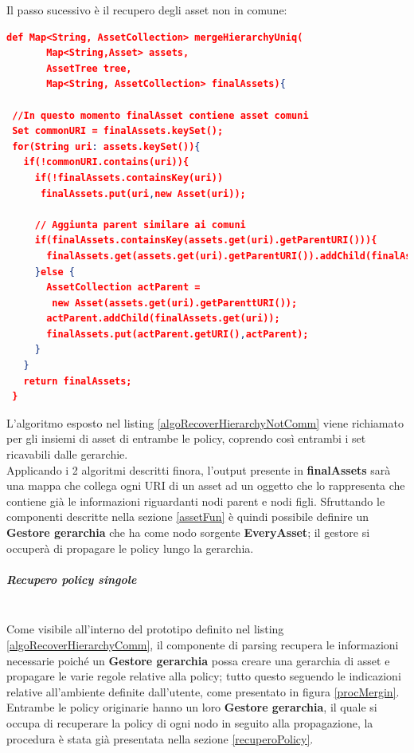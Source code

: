 \documentclass[12pt,a4paper,twoside]{book}
\begin{document}
Il passo sucessivo è il recupero degli asset non in comune:
\begin{lstlisting}[language=Json,firstnumber=1,caption={L'algoritmo ha prestazioni lineari in proporzione al numero di asset},label=algoRecoverHierarchyNotComm,captionpos=b]
def Map<String, AssetCollection> mergeHierarchyUniq(
       Map<String,Asset> assets,
       AssetTree tree,
       Map<String, AssetCollection> finalAssets){
       
 //In questo momento finalAsset contiene asset comuni      
 Set commonURI = finalAssets.keySet();  
 for(String uri: assets.keySet()){
   if(!commonURI.contains(uri)){
     if(!finalAssets.containsKey(uri))
      finalAssets.put(uri,new Asset(uri));
      
	 // Aggiunta parent similare ai comuni
     if(finalAssets.containsKey(assets.get(uri).getParentURI())){
       finalAssets.get(assets.get(uri).getParentURI()).addChild(finalAssets.get(uri));
     }else {
       AssetCollection actParent =
        new Asset(assets.get(uri).getParenttURI());
       actParent.addChild(finalAssets.get(uri));
       finalAssets.put(actParent.getURI(),actParent);
     }
   }
   return finalAssets;
 }
\end{lstlisting}
L'algoritmo esposto nel listing \ref{algoRecoverHierarchyNotComm} viene richiamato per gli insiemi di asset di entrambe le policy, coprendo così entrambi i set ricavabili dalle gerarchie.\\
Applicando i 2 algoritmi descritti finora, l'output presente in \textbf{finalAssets} sarà una mappa che collega ogni URI di un asset ad un oggetto che lo rappresenta che contiene già le informazioni riguardanti nodi parent e nodi figli. Sfruttando le componenti descritte nella sezione \ref{assetFun} è quindi possibile definire un \textbf{Gestore gerarchia} che ha come nodo sorgente \textbf{EveryAsset}; il gestore si occuperà di propagare le policy lungo la gerarchia.
\subparagraph{Recupero policy singole}\mbox{}\\
Come visibile all'interno del prototipo definito nel listing \ref{algoRecoverHierarchyComm}, il componente di parsing recupera le informazioni necessarie poiché un \textbf{Gestore gerarchia} possa creare una gerarchia di asset e propagare le varie regole relative alla policy; tutto questo seguendo le indicazioni relative all'ambiente definite dall'utente, come presentato in figura \ref{procMergin}.\\
Entrambe le policy originarie hanno un loro \textbf{Gestore gerarchia}, il quale si occupa di recuperare la policy di ogni nodo in seguito alla propagazione, la procedura è stata già presentata nella sezione \ref{recuperoPolicy}.\\
\end{document}
